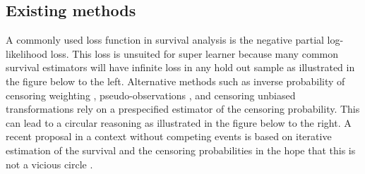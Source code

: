 \documentclass[a0,portrait]{a0poster}
\newcommand{\1}{\mathds{1}}
\begin{document}
\begin{minipage}{\textwidth}
\begin{minipage}[t]{1\linewidth}
\begin{multicols}{2}




\vspace{-2em}

\section*{Existing methods}

A commonly used loss function in survival analysis is the negative partial
log-likelihood loss. This loss is unsuited for super learner because many common
survival estimators will have infinite loss in any hold out sample as
illustrated in the figure below to the left. Alternative methods such as
inverse probability of censoring weighting
\cite{graf1999assessment,gonzalez2021stacked}, pseudo-observations
\cite{andersen2003generalised,sachs2019ensemble}, and censoring unbiased
transformations \cite{steingrimsson2019censoring} rely on a prespecified
estimator of the censoring probability. This can lead to a circular reasoning as
illustrated in the figure below to the right. A recent proposal in a context
without competing events is based on iterative estimation of the survival and
the censoring probabilities in the hope that this is not a vicious circle
\cite{westling2021inference}.



\end{multicols}
\end{minipage}
\end{minipage}
\end{document}
